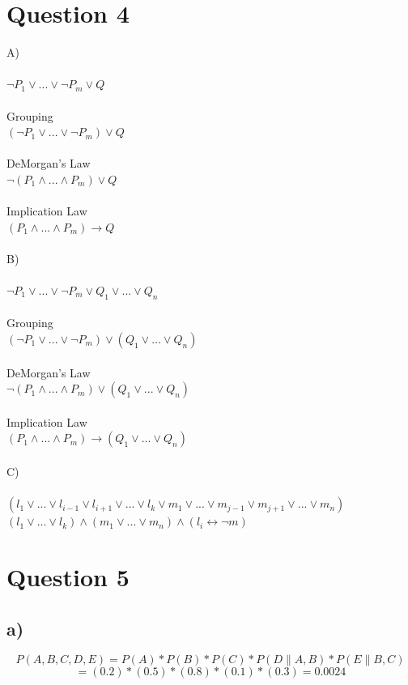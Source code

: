 \documentclass[11pt]{article} %
\begin{document}
\section*{Question 4}
A)\\\\
$\neg P_{1} \vee ... \vee \neg P_{m} \vee Q$\\\\
Grouping\\
$(\neg P_{1} \vee ... \vee \neg P_{m}) \vee Q$\\\\
DeMorgan's Law\\
$\neg (P_{1} \wedge ... \wedge P_{m}) \vee Q$\\\\
Implication Law\\
$(P_{1} \wedge ... \wedge P_{m}) \rightarrow Q$\\\\
B)\\\\
$\neg P_{1} \vee ... \vee \neg P_{m} \vee Q_{1} \vee ... \vee Q_{n}$\\\\
Grouping\\
$(\neg P_{1} \vee ... \vee \neg P_{m}) \vee (Q_{1} \vee ... \vee Q_{n})$\\\\
DeMorgan's Law\\
$\neg (P_{1} \wedge ... \wedge P_{m}) \vee (Q_{1} \vee ... \vee Q_{n})$\\\\
Implication Law\\
$(P_{1} \wedge ... \wedge P_{m}) \rightarrow (Q_{1} \vee ... \vee Q_{n})$\\\\
C)\\\\
$(l_{1} \vee ... \vee l_{i-1} \vee l_{i+1} \vee ... \vee l_{k} \vee m_{1} \vee ... \vee m_{j-1} \vee m_{j+1} \vee ... \vee m_{n} )$\\
$(l_{1}\vee ... \vee l_{k})\wedge(m_{1}\vee ... \vee m_{n})\wedge(l_{i} \leftrightarrow \neg m)$

\section*{Question 5}

\subsection*{a)}
\begin{equation} \tag {5.1}
P(A, B, C, D, E) = P(A) * P(B) * P(C) * P(D \| A, B) * P(E \| B, C)
\end{equation}
\begin{equation}  \tag {5.2}
				 = (0.2) * (0.5) * (0.8) * (0.1) * (0.3) = 0.0024
\end{equation}
\end{document}
